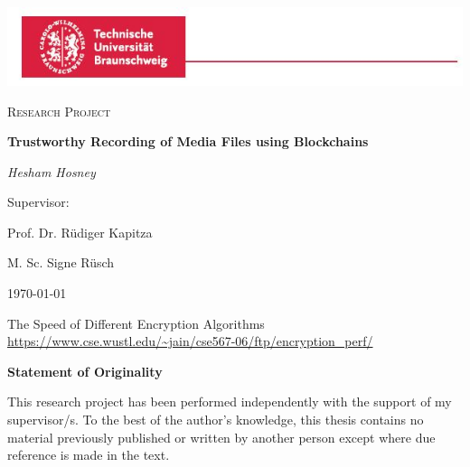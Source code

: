 \documentclass{report}
\begin{document}
\begin{titlepage}
	\centering
	\includegraphics[width=\paperwidth]{images/logo.jpg}\par\vspace{1cm}
	{\scshape\LARGE  \par}
	\vspace{1cm}
	{\scshape\Large Research Project\par}
	\vspace{1.5cm}
	{\huge\bfseries Trustworthy Recording of Media Files using Blockchains \par}
	\vspace{1cm}
	{\huge\itshape Hesham Hosney\par}
        \vspace{2cm} 
	{\Large Supervisor:\par } 
	{\huge Prof. Dr. Rüdiger Kapitza\par}
        \vspace{.5cm} 
        {\huge M. Sc. Signe Rüsch}
	\vfill
	{\large \today\par}
\end{titlepage}


\cleardoublepage

\tableofcontents

\cleardoublepage







\cleardoublepage
\listoffigures
\begin{thebibliography}{9}

The Speed of Different Encryption Algorithms
\url{https://www.cse.wustl.edu/~jain/cse567-06/ftp/encryption_perf/}
\appendix
\end{thebibliography}
\cleardoublepage
\centerline{\bfseries Statement of Originality}
	\vspace*{1em}
	\noindent
	This research project has been performed independently with the support of my supervisor/s.
	To the best of the author's knowledge, this thesis contains no material previously
	published or written by another person except where due reference is made in the text.
\end{document}
